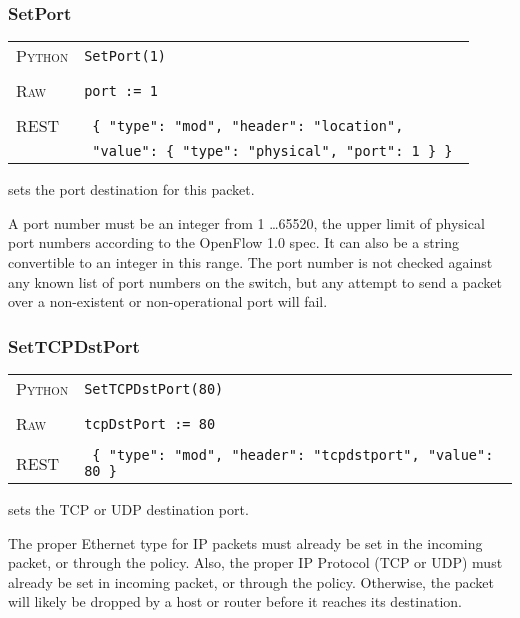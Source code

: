 \subsubsection{SetPort}

\bigskip
\begin{tabularx}{\linewidth}{lX}
\textsc{Python}   & \texttt{SetPort(1)} \\ \\
\textsc{Raw}    & \texttt{port := 1}     \\ \\
\textsc{REST} & \texttt{ \{ "type": "mod", "header": "location", } \\
 & \texttt{ "value": \{ "type": "physical", "port": 1 \} \} } 
\end{tabularx}

 sets the port destination for this packet.      

A port number must be an integer from
1 \ldots 65520, the upper limit of physical port numbers according to the OpenFlow 1.0 spec.  It can also be 
a string convertible to an integer in this range.  The port number is not checked against any known list
of port numbers on the switch, but any attempt to send a packet over a non-existent or non-operational
port will fail.  

\subsubsection{SetTCPDstPort}

\bigskip
\begin{tabularx}{\linewidth}{lX}
\textsc{Python}   & \texttt{SetTCPDstPort(80)} \\ \\
\textsc{Raw}    & \texttt{tcpDstPort := 80}     \\ \\
\textsc{REST} & \texttt{ \{ "type": "mod", "header": "tcpdstport", "value": 80 \} }
\end{tabularx}

 sets the TCP or UDP destination port.      

The proper Ethernet type for IP packets must already be set in the incoming packet, or through the 
 policy.  
Also, the proper IP Protocol (TCP or UDP) must already be set in incoming packet, or through the 
 policy.  
Otherwise, the packet will likely be dropped by a host or router before it 
reaches its destination.

